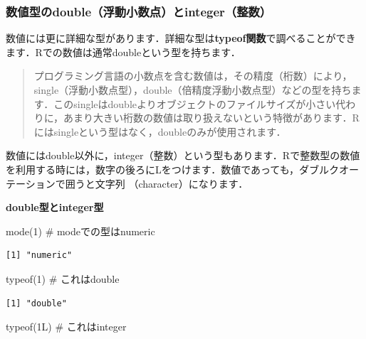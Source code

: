 \documentclass[
  letterpaper,
  DIV=11,
  numbers=noendperiod]{scrreprt}
\newenvironment{Shaded}{\begin{snugshade}}{\end{snugshade}}
\newcommand{\CommentTok}[1]{\textcolor[rgb]{0.37,0.37,0.37}{#1}}
\newcommand{\DecValTok}[1]{\textcolor[rgb]{0.68,0.00,0.00}{#1}}
\newcommand{\FunctionTok}[1]{\textcolor[rgb]{0.28,0.35,0.67}{#1}}
\newcommand{\NormalTok}[1]{\textcolor[rgb]{0.00,0.23,0.31}{#1}}
\begin{document}
\hypertarget{ux6570ux5024ux578bux306edoubleux6d6eux52d5ux5c0fux6570ux70b9ux3068integerux6574ux6570}{%
\subsubsection{数値型のdouble（浮動小数点）とinteger（整数）}\label{ux6570ux5024ux578bux306edoubleux6d6eux52d5ux5c0fux6570ux70b9ux3068integerux6574ux6570}}

数値には更に詳細な型があります．詳細な型は\textbf{typeof関数}で調べることができます．Rでの数値は通常doubleという型を持ちます．

\begin{quote}
プログラミング言語の小数点を含む数値は，その精度（桁数）により，single（浮動小数点型），double（倍精度浮動小数点型）などの型を持ちます．このsingleはdoubleよりオブジェクトのファイルサイズが小さい代わりに，あまり大きい桁数の数値は取り扱えないという特徴があります．Rにはsingleという型はなく，doubleのみが使用されます．
\end{quote}

数値にはdouble以外に，integer（整数）という型もあります．Rで整数型の数値を利用する時には，数字の後ろにLをつけます．数値であっても，ダブルクオーテーションで囲うと文字列
（character）になります．

\textbf{double型とinteger型}

\begin{Shaded}
\begin{Highlighting}[]
\FunctionTok{mode}\NormalTok{(}\DecValTok{1}\NormalTok{) }\CommentTok{\# modeでの型はnumeric}
\end{Highlighting}
\end{Shaded}

\begin{verbatim}
[1] "numeric"
\end{verbatim}

\begin{Shaded}
\begin{Highlighting}[]
\FunctionTok{typeof}\NormalTok{(}\DecValTok{1}\NormalTok{) }\CommentTok{\# これはdouble}
\end{Highlighting}
\end{Shaded}

\begin{verbatim}
[1] "double"
\end{verbatim}

\begin{Shaded}
\begin{Highlighting}[]
\FunctionTok{typeof}\NormalTok{(1L) }\CommentTok{\# これはinteger}
\end{Highlighting}
\end{Shaded}
\end{document}
